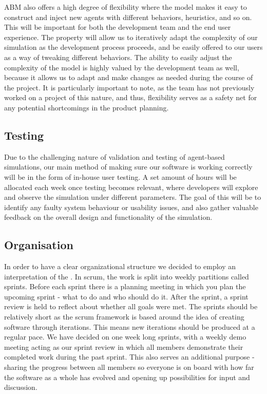     ABM also offers a high degree of flexibility where the model makes it easy to construct and inject new agents with different behaviors, heuristics, and so on. This will be important for both the development team and the end user experience. The property will allow us to iteratively adapt the complexity of our simulation as the development process proceeds, and be easily offered to our users as a way of tweaking different behaviors. The ability to easily adjust the complexity of the model is highly valued by the development team as well, because it allows us to adapt and make changes as needed during the course of the project. It is particularly important to note, as the team has not previously worked on a project of this nature, and thus, flexibility serves as a safety net for any potential shortcomings in the product planning.

\subsection{Testing}
    Due to the challenging nature of validation and testing of agent-based simulations, our main method of making sure our software is working correctly will be in the form of in-house user testing. A set amount of hours will be allocated each week once testing becomes relevant, where developers will explore and observe the simulation under different parameters. The goal of this will be to identify any faulty system behaviour or usability issues, and also gather valuable feedback on the overall design and functionality of the simulation.

\subsection{Organisation}
    In order to have a clear organizational structure we decided to employ an interpretation of the  \cite{scrum}. In scrum, the work is split into weekly partitions called sprints. Before each sprint there is a planning meeting in which you plan the upcoming sprint - what to do and who should do it. After the sprint, a sprint review is held to reflect about whether all goals were met. The sprints should be relatively short as the scrum framework is based around the idea of creating software through iterations. This means new iterations should be produced at a regular pace. We have decided on one week long sprints, with a weekly demo meeting acting as our sprint review in which all members demonstrate their completed work during the past sprint. This also serves an additional purpose - sharing the progress between all members so everyone is on board with how far the software as a whole has evolved and opening up possibilities for input and discussion.

